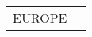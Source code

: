 \documentclass[journal abbreviation, manuscript]{copernicus}
\begin{document}
\begin{table}
\begin{tabularx}{\textwidth}{lX}
        EUROPE &                                                                                                                                                                                                                                                                                                                                                                                                                                                                                                                                                                                                                                                                                                                                                                                                                                                                                                                                                                                                                                                                                                                                                                                                                                                                                                                                                                                                                                                                                                                                                                                                                                                                                                                                                                                                                                                                                                                                                                                                                                                                                                                                                                                                                                                                                                                                                                                                                                                                                                                                                                                                                                                                                                                                                                                                                                                                                                                                                                                                                                                                                                                                                                                                                                                                                                                                                                                                         
\end{tabularx}
\end{table}
\end{document}
